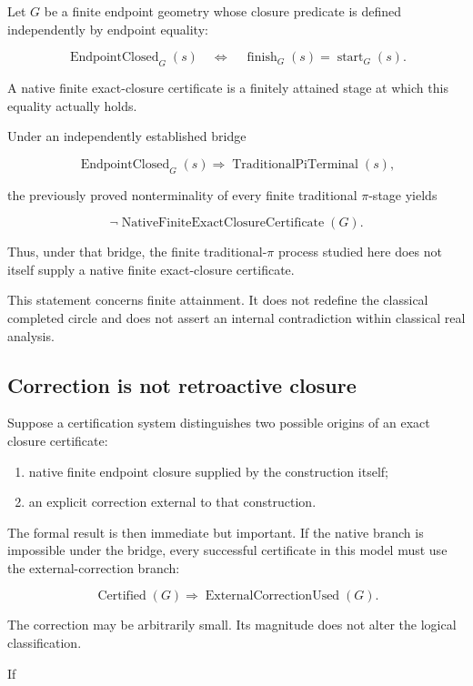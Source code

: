 \documentclass[11pt,a4paper]{article}
\begin{document}
Let \(G\) be a finite endpoint geometry whose closure predicate is
defined independently by endpoint equality:

\[
\operatorname{EndpointClosed}_G(s)
\quad\Longleftrightarrow\quad
\operatorname{finish}_G(s)=\operatorname{start}_G(s).
\]

A native finite exact-closure certificate is a finitely attained stage
at which this equality actually holds.

Under an independently established bridge

\[
\operatorname{EndpointClosed}_G(s)
\Longrightarrow
\operatorname{TraditionalPiTerminal}(s),
\]

the previously proved nonterminality of every finite traditional
\(\pi\)-stage yields

\[
\neg
\operatorname{NativeFiniteExactClosureCertificate}(G).
\]

Thus, under that bridge, the finite traditional-\(\pi\) process studied
here does not itself supply a native finite exact-closure certificate.

This statement concerns finite attainment. It does not redefine the
classical completed circle and does not assert an internal contradiction
within classical real analysis.

\subsection{Correction is not retroactive closure}

Suppose a certification system distinguishes two possible origins of an
exact closure certificate:

\begin{enumerate}
\item native finite endpoint closure supplied by the construction itself;
\item an explicit correction external to that construction.
\end{enumerate}

The formal result is then immediate but important. If the native branch
is impossible under the bridge, every successful certificate in this
model must use the external-correction branch:

\[
\operatorname{Certified}(G)
\Longrightarrow
\operatorname{ExternalCorrectionUsed}(G).
\]

The correction may be arbitrarily small. Its magnitude does not alter
the logical classification.

If
\end{document}
